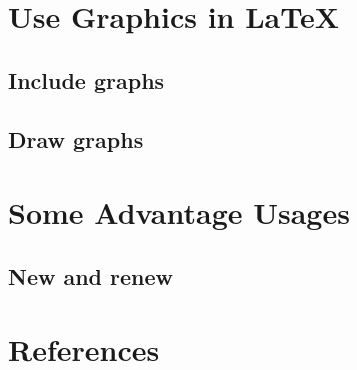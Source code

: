 \documentclass{beamer}
\begin{document}
\begin{frame}

\end{frame}

\section{Use Graphics in \LaTeX}
\begin{frame}
\end{frame}

\subsection{Include graphs}

\begin{frame}

\end{frame}

\subsection{Draw graphs}

\begin{frame}

\end{frame}

\section{Some Advantage Usages}
\begin{frame}
\end{frame}

\subsection{New and renew}

\begin{frame}

\end{frame}

\section{References}
\begin{frame}
\end{frame}
\end{document}
